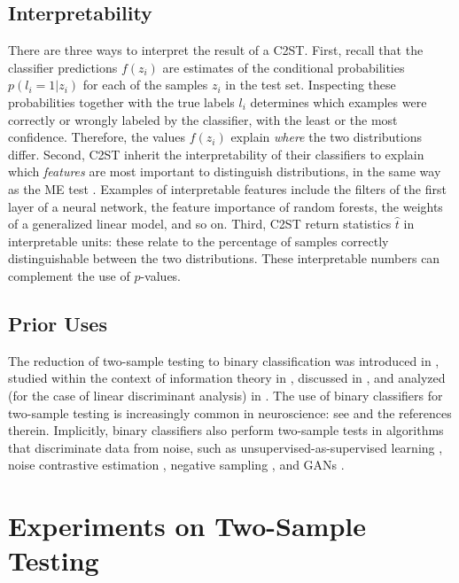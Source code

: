 \documentclass[a4paper]{article}
\begin{document}
  \subsection{Interpretability}

  There are three ways to interpret the result of a C2ST. First, recall that
  the classifier predictions $f(z_i)$ are estimates of the conditional
  probabilities $p(l_i = 1 |z_i)$ for each of the samples $z_i$ in the test
  set. Inspecting these probabilities together with the true labels $l_i$
  determines which examples were correctly or wrongly labeled by the classifier,
  with the least or the most confidence. Therefore, the values $f(z_i)$ explain
  \emph{where} the two distributions differ.  Second, C2ST inherit the
  interpretability of their classifiers to explain which \emph{features} are
  most important to distinguish distributions, in the same way as the ME
  test \citep{metests}.  Examples of interpretable features include the filters
  of the first layer of a neural network, the feature importance of random
  forests, the weights of a generalized linear model, and so on.  Third, C2ST
  return statistics $\hat{t}$ in interpretable units: these
  relate to the percentage of samples correctly distinguishable between the two
  distributions. These interpretable numbers can complement the use of
  $p$-values. 

  \subsection{Prior Uses}

  The reduction of two-sample testing to binary classification was introduced
  in \citep{friedman2003multivariate}, studied within the context of
  information theory in
  \citep{perez2009estimation,reid2011information}, discussed in
  \citep{Fukumizu2009,gretton2012kernel}, and analyzed (for the case of linear
  discriminant analysis) in \citep{ramdas16}. The use of binary classifiers for
  two-sample testing is increasingly common in neuroscience: see
  \citep{pereira2009machine,olivetti2012induction} and the references therein.
  Implicitly, binary classifiers also perform two-sample tests in algorithms
  that discriminate data from noise, such as unsupervised-as-supervised
  learning \citep{friedman2001elements}, noise contrastive estimation
  \citep{gutmann2012noise}, negative sampling \citep{mikolov2013distributed},
  and GANs \citep{goodfellow2014generative}.

  \section{Experiments on Two-Sample Testing}\label{sec:experiments}
\end{document}
